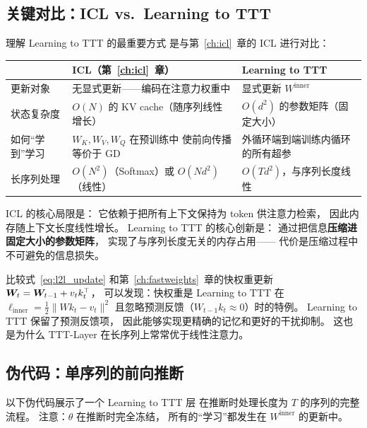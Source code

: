 \subsection*{关键对比：ICL vs.\ Learning to TTT}

理解 Learning to TTT 的最重要方式
是与第~\ref{ch:icl}~章的 ICL 进行对比：

\begin{center}
\begin{tabular}{p{3.5cm} p{5cm} p{5cm}}
\toprule
& \textbf{ICL（第~\ref{ch:icl}~章）} & \textbf{Learning to TTT} \\
\midrule
更新对象 & 无显式更新——编码在注意力权重中 & 显式更新 $W^{\text{inner}}$ \\
状态复杂度 & $O(N)$ 的 KV cache（随序列线性增长） & $O(d^2)$ 的参数矩阵（固定大小） \\
如何``学到''学习 & $W_K, W_V, W_Q$ 在预训练中
使前向传播等价于 GD & 外循环端到端训练内循环的所有超参 \\
长序列处理 & $O(N^2)$（Softmax）或 $O(Nd^2)$（线性） & $O(Td^2)$，与序列长度线性 \\
\bottomrule
\end{tabular}
\end{center}

ICL 的核心局限是：
它依赖于把所有上下文保持为 token 供注意力检索，
因此内存随上下文长度线性增长。
Learning to TTT 的核心创新是：
通过把信息\textbf{压缩进固定大小的参数矩阵}，
实现了与序列长度无关的内存占用——
代价是压缩过程中不可避免的信息损失。

\begin{remark}[与快权重的关系]
比较式~\eqref{eq:l2l_update} 和第~\ref{ch:fastweights}~章的快权重更新
$\boldsymbol{W}_t = \boldsymbol{W}_{t-1} + v_t k_t^\top$，
可以发现：快权重是 Learning to TTT 在
$\ell_{\text{inner}} = \frac{1}{2}\|Wk_t - v_t\|^2$
且忽略预测反馈（$W_{t-1}k_t \approx 0$）时的特例。
Learning to TTT 保留了预测反馈项，
因此能够实现更精确的记忆和更好的干扰抑制。
这也是为什么 TTT-Layer 在长序列上常常优于线性注意力。
\end{remark}

\subsection*{伪代码：单序列的前向推断}

以下伪代码展示了一个 Learning to TTT 层
在推断时处理长度为 $T$ 的序列的完整流程。
注意：$\theta$ 在推断时完全冻结，
所有的``学习''都发生在 $W^{\text{inner}}$ 的更新中。

